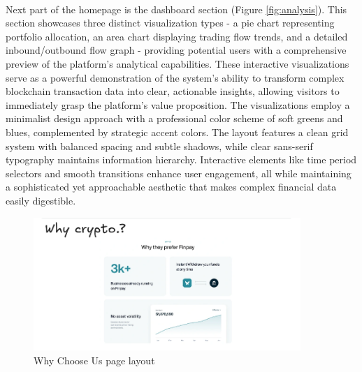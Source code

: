 \paragraph{}Next part of the homepage is the dashboard section (Figure \ref{fig:analysis}). This section showcases three distinct visualization types - a pie chart representing portfolio allocation, an area chart displaying trading flow trends, and a detailed inbound/outbound flow graph - providing potential users with a comprehensive preview of the platform's analytical capabilities. These interactive visualizations serve as a powerful demonstration of the system's ability to transform complex blockchain transaction data into clear, actionable insights, allowing visitors to immediately grasp the platform's value proposition. The visualizations employ a minimalist design approach with a professional color scheme of soft greens and blues, complemented by strategic accent colors. The layout features a clean grid system with balanced spacing and subtle shadows, while clear sans-serif typography maintains information hierarchy. Interactive elements like time period selectors and smooth transitions enhance user engagement, all while maintaining a sophisticated yet approachable aesthetic that makes complex financial data easily digestible.
 \begin{figure}[h]
    \centering
    \includegraphics[width= 0.9\textwidth, keepaspectratio]{root/why.png}
     \caption{Why Choose Us page layout}
    \label{fig:Why choose us}
\end{figure}
